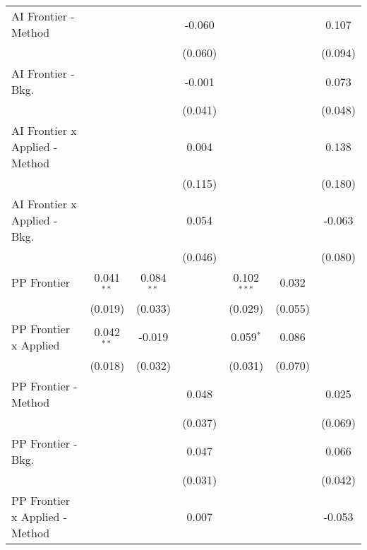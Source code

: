 \begin{tabular}{lcccccc}
   AI Frontier - Method           &              &              & -0.060       &               &         & 0.107\\   
                                  &              &              & (0.060)      &               &         & (0.094)\\   
   AI Frontier - Bkg.             &              &              & -0.001       &               &         & 0.073\\   
                                  &              &              & (0.041)      &               &         & (0.048)\\   
   AI Frontier x Applied - Method &              &              & 0.004        &               &         & 0.138\\   
                                  &              &              & (0.115)      &               &         & (0.180)\\   
   AI Frontier x Applied - Bkg.   &              &              & 0.054        &               &         & -0.063\\   
                                  &              &              & (0.046)      &               &         & (0.080)\\   
   PP Frontier                    & 0.041$^{**}$ & 0.084$^{**}$ &              & 0.102$^{***}$ & 0.032   &   \\   
                                  & (0.019)      & (0.033)      &              & (0.029)       & (0.055) &   \\   
   PP Frontier x Applied          & 0.042$^{**}$ & -0.019       &              & 0.059$^{*}$   & 0.086   &   \\   
                                  & (0.018)      & (0.032)      &              & (0.031)       & (0.070) &   \\   
   PP Frontier - Method           &              &              & 0.048        &               &         & 0.025\\   
                                  &              &              & (0.037)      &               &         & (0.069)\\   
   PP Frontier - Bkg.             &              &              & 0.047        &               &         & 0.066\\   
                                  &              &              & (0.031)      &               &         & (0.042)\\   
   PP Frontier x Applied - Method &              &              & 0.007        &               &         & -0.053\\   

\end{tabular}
